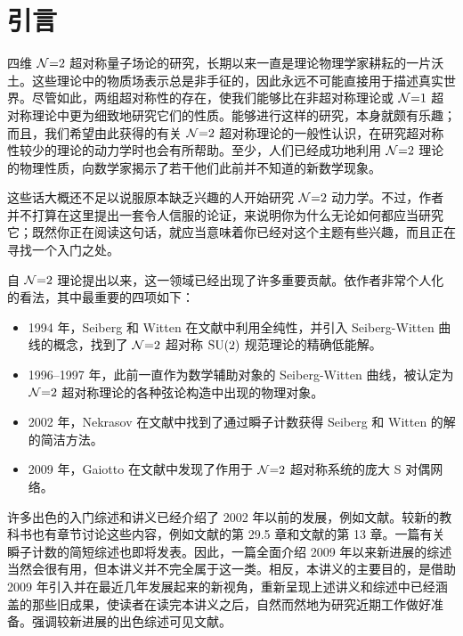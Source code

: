 \section{引言}

四维 $\mathcal{N}{=}2$ 超对称量子场论的研究，长期以来一直是理论物理学家耕耘的一片沃土。这些理论中的物质场表示总是非手征的，因此永远不可能直接用于描述真实世界。尽管如此，两组超对称性的存在，使我们能够比在非超对称理论或 $\mathcal{N}{=}1$ 超对称理论中更为细致地研究它们的性质。能够进行这样的研究，本身就颇有乐趣；而且，我们希望由此获得的有关 $\mathcal{N}{=}2$ 超对称理论的一般性认识，在研究超对称性较少的理论的动力学时也会有所帮助。至少，人们已经成功地利用 $\mathcal{N}{=}2$ 理论的物理性质，向数学家揭示了若干他们此前并不知道的新数学现象。

这些话大概还不足以说服原本缺乏兴趣的人开始研究 $\mathcal{N}{=}2$ 动力学。不过，作者并不打算在这里提出一套令人信服的论证，来说明你为什么无论如何都应当研究它；既然你正在阅读这句话，就应当意味着你已经对这个主题有些兴趣，而且正在寻找一个入门之处。

自 $\mathcal{N}{=}2$ 理论提出以来\cite{Fayet:1975yi}，这一领域已经出现了许多重要贡献。依作者非常个人化的看法，其中最重要的四项如下：
\begin{itemize}
\item 1994 年，Seiberg 和 Witten 在文献\cite{Seiberg:1994rs,Seiberg:1994aj}中利用全纯性，并引入 Seiberg-Witten 曲线的概念，找到了 $\mathcal{N}{=}2$ 超对称 $\mathop{\mathrm{SU}}(2)$ 规范理论的精确低能解。
\item 1996--1997 年，此前一直作为数学辅助对象的 Seiberg-Witten 曲线，被认定为 $\mathcal{N}{=}2$ 超对称理论的各种弦论构造中出现的物理对象\cite{Klemm:1996bj,Banks:1996nj,Witten:1997sc}。
\item 2002 年，Nekrasov 在文献\cite{Nekrasov:2002qd}中找到了通过瞬子计数获得 Seiberg 和 Witten 的解的简洁方法。
\item 2009 年，Gaiotto 在文献\cite{Gaiotto:2009we}中发现了作用于 $\mathcal{N}{=}2$ 超对称系统的庞大 S 对偶网络。
\end{itemize}

许多出色的入门综述和讲义已经介绍了 2002 年以前的发展，例如文献\cite{Bilal:1995hc,Lerche:1996xu,AlvarezGaume:1996mv,Klemm:1997gg,Peskin:1997qi,DiVecchia:1998ky,Argyres1998Lecture,Giveon:1998sr,D'Hoker:1999ft}。较新的教科书也有章节讨论这些内容，例如文献\cite{WeinbergIII}的第 29.5 章和文献\cite{Terning}的第 13 章。一篇有关瞬子计数的简短综述也即将发表\cite{TachikawaInstantonReview}。因此，一篇全面介绍 2009 年以来新进展的综述当然会很有用，但本讲义并不完全属于这一类。相反，本讲义的主要目的，是借助 2009 年引入并在最近几年发展起来的新视角，重新呈现上述讲义和综述中已经涵盖的那些旧成果，使读者在读完本讲义之后，自然而然地为研究近期工作做好准备。强调较新进展的出色综述可见文献\cite{JaewonThesis,Giacomelli:2013tia}。

